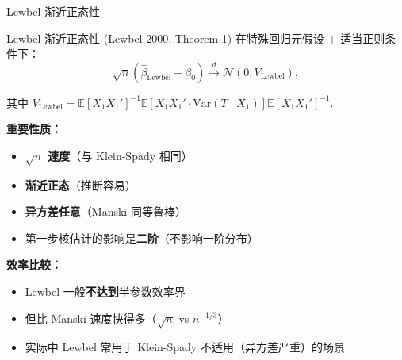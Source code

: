 \documentclass[aspectratio=169, 10pt]{beamer}
\begin{document}
\begin{frame}[shrink=10]{Lewbel 渐近正态性}

  \begin{definitionbox}{{Lewbel 渐近正态性 (Lewbel 2000, Theorem 1)}}
    在特殊回归元假设 + 适当正则条件下：
    $$\sqrt{n}(\hat\beta_{\text{Lewbel}} - \beta_0) \overset{d}{\to}
    \mathcal{N}(0, V_{\text{Lewbel}}),$$

    其中 $V_{\text{Lewbel}} = \mathbb{E}[X_1 X_1']^{-1} \mathbb{E}[X_1 X_1' \cdot \text{Var}(T \mid X_1)] \mathbb{E}[X_1 X_1']^{-1}$.
  \end{definitionbox}

  \begin{highlightbox}
    \textbf{重要性质：}
    \begin{itemize}\setlength{\itemsep}{1pt}
      \item \textbf{$\sqrt{n}$ 速度}（与 Klein-Spady 相同）
      \item \textbf{渐近正态}（推断容易）
      \item \textbf{异方差任意}（Manski 同等鲁棒）
      \item 第一步核估计的影响是\textbf{二阶}（不影响一阶分布）
    \end{itemize}
  \end{highlightbox}

  \begin{keybox}
    \textbf{效率比较：}
    \begin{itemize}\setlength{\itemsep}{1pt}
      \item Lewbel 一般\textbf{不达到}半参数效率界
      \item 但比 Manski 速度快得多（$\sqrt{n}$ vs $n^{-1/3}$）
      \item 实际中 Lewbel 常用于 Klein-Spady 不适用（异方差严重）的场景
    \end{itemize}
  \end{keybox}

\end{frame}
\end{document}
